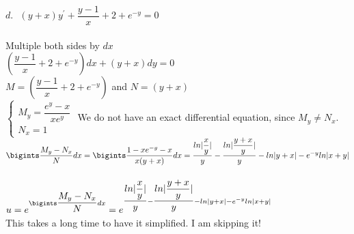 \documentclass[fleqn]{article}
\begin{document}
\begin{enumerate}
      \textcolor{hwColor}{ 
        $d. ~~~ (y+x)y^{\prime}+\dfrac{y-1}{x}+2+e^{-y}=0$ \\
        \\
        Multiple both sides by $dx$ \\
        $(\dfrac{y-1}{x}+2+e^{-y})dx+(y+x)dy=0$ \\
        $M=(\dfrac{y-1}{x}+2+e^{-y})$ and $N=(y+x)$ \\
        $
        \begin{cases}
          M_y=\dfrac{e^y-x}{xe^y}\\
          N_x=1
        \end{cases} 
        $ We do not have an exact differential equation, since $M_y \ne N_x$. \\
        $\bigints \dfrac{M_y-N_x}{N}dx=\bigints \dfrac{1-xe^{-y}-x}{x(y+x)}dx=\dfrac{ln|\dfrac{x}{y}|}{y}-\dfrac{ln|\dfrac{y+x}{y}|}{y}-ln|y+x|-e^{-y}ln|x+y|$ \\
        \\
        $u=e^{\bigints \dfrac{M_y-N_x}{N}dx}=e^{\dfrac{ln|\dfrac{x}{y}|}{y}-\dfrac{ln|\dfrac{y+x}{y}|}{y}-ln|y+x|-e^{-y}ln|x+y|}$ \\
        This takes a long time to have it simplified. I am skipping it! 
      }
  \end{enumerate}
\end{document}
